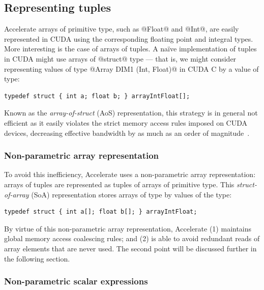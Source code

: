 \subsection{Representing tuples}
\label{sec:representing_tuples}

\cg[tuples|(]{}

Accelerate arrays of primitive type, such as @Float@ and @Int@, are
easily represented in CUDA using the corresponding floating point and integral
types. More interesting is the case of arrays of tuples. A na\"ive
implementation of tuples in CUDA might use arrays of @struct@ type --- that
is, we might consider representing values of type @Array DIM1 (Int, Float)@
in CUDA C by a value of type:
%
\begin{lstlisting}[style=cuda]
typedef struct { int a; float b; } arrayIntFloat[];
\end{lstlisting}
%
Known as the \emph{array-of-struct} (AoS)
representation, this strategy is in general not efficient as it easily violates
the strict memory access rules imposed on CUDA devices, decreasing effective
bandwidth by as much as an order of magnitude~\cite{NVIDIA:2012wf}.

\subsubsection{Non-parametric array representation}

To avoid this inefficiency, Accelerate uses a  non-parametric array representation: arrays of tuples are
represented as tuples of arrays of primitive type. This \emph{struct-of-array}
(SoA) representation stores arrays of type
 by values of the type:
%
\begin{lstlisting}[style=cuda]
typedef struct { int a[]; float b[]; } arrayIntFloat;
\end{lstlisting}
%
By virtue of this  non-parametric array
representation, Accelerate (1) maintains global memory access coalescing rules;
and (2) is able to avoid redundant reads of array elements that are never used.
The second point will be discussed further in the following section.

\subsubsection{Non-parametric scalar expressions}

